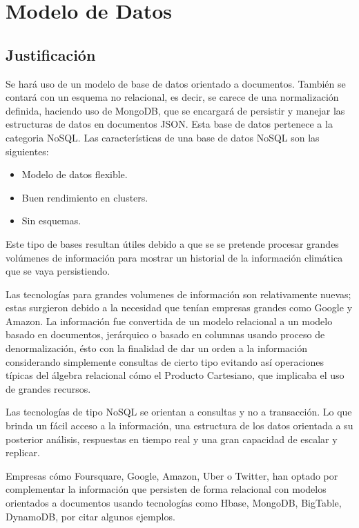 \clearpage
\chapter{Modelo de Datos}

\section{Justificación}

Se hará uso de un modelo de base de datos orientado a documentos. También se contará con un esquema no relacional, es decir, se carece de una normalización definida, haciendo uso de  MongoDB, que se encargará de persistir y manejar las estructuras de datos en documentos JSON. Esta base de datos pertenece a la categoria NoSQL.
\newline
Las características de una base de datos NoSQL son las siguientes:
\begin{itemize}
  \item Modelo de datos flexible.
  \item Buen rendimiento en clusters. 
  \item Sin esquemas.
\end{itemize}

Este tipo de bases resultan útiles debido a que se se pretende procesar grandes volúmenes de información para mostrar un historial de la información climática que se vaya persistiendo. 

Las tecnologías para grandes volumenes de información son relativamente nuevas; estas surgieron debido a la necesidad que tenían empresas grandes como Google y Amazon. La información fue convertida de un modelo relacional a un modelo basado en documentos, jerárquico o basado en columnas usando proceso de denormalización, ésto con la finalidad de dar un orden a la información considerando simplemente consultas de cierto tipo evitando así operaciones típicas del álgebra relacional cómo el Producto Cartesiano, que implicaba el uso de grandes recursos.

Las tecnologías de tipo NoSQL se orientan a consultas y no a transacción. Lo que brinda un fácil acceso a la información, una estructura de los datos orientada a su posterior análisis, respuestas en tiempo real y una gran capacidad de escalar y replicar. \cite{10}

Empresas cómo Foursquare, Google, Amazon, Uber o Twitter, han optado por complementar la información que persisten de forma relacional con modelos orientados a documentos usando tecnologías como Hbase, MongoDB, BigTable, DynamoDB, por citar algunos ejemplos. \cite{11} \cite{12}

